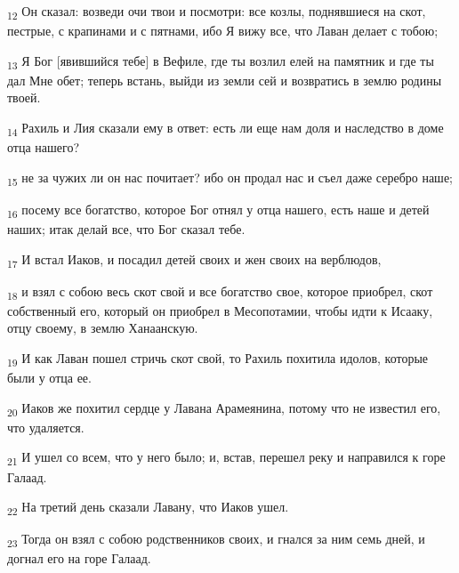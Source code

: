 \begin{tcolorbox}
\textsubscript{12} Он сказал: возведи очи твои и посмотри: все козлы, поднявшиеся на скот, пестрые, с крапинами и с пятнами, ибо Я вижу все, что Лаван делает с тобою;
\end{tcolorbox}
\begin{tcolorbox}
\textsubscript{13} Я Бог [явившийся тебе] в Вефиле, где ты возлил елей на памятник и где ты дал Мне обет; теперь встань, выйди из земли сей и возвратись в землю родины твоей.
\end{tcolorbox}
\begin{tcolorbox}
\textsubscript{14} Рахиль и Лия сказали ему в ответ: есть ли еще нам доля и наследство в доме отца нашего?
\end{tcolorbox}
\begin{tcolorbox}
\textsubscript{15} не за чужих ли он нас почитает? ибо он продал нас и съел даже серебро наше;
\end{tcolorbox}
\begin{tcolorbox}
\textsubscript{16} посему все богатство, которое Бог отнял у отца нашего, есть наше и детей наших; итак делай все, что Бог сказал тебе.
\end{tcolorbox}
\begin{tcolorbox}
\textsubscript{17} И встал Иаков, и посадил детей своих и жен своих на верблюдов,
\end{tcolorbox}
\begin{tcolorbox}
\textsubscript{18} и взял с собою весь скот свой и все богатство свое, которое приобрел, скот собственный его, который он приобрел в Месопотамии, чтобы идти к Исааку, отцу своему, в землю Ханаанскую.
\end{tcolorbox}
\begin{tcolorbox}
\textsubscript{19} И как Лаван пошел стричь скот свой, то Рахиль похитила идолов, которые были у отца ее.
\end{tcolorbox}
\begin{tcolorbox}
\textsubscript{20} Иаков же похитил сердце у Лавана Арамеянина, потому что не известил его, что удаляется.
\end{tcolorbox}
\begin{tcolorbox}
\textsubscript{21} И ушел со всем, что у него было; и, встав, перешел реку и направился к горе Галаад.
\end{tcolorbox}
\begin{tcolorbox}
\textsubscript{22} На третий день сказали Лавану, что Иаков ушел.
\end{tcolorbox}
\begin{tcolorbox}
\textsubscript{23} Тогда он взял с собою родственников своих, и гнался за ним семь дней, и догнал его на горе Галаад.
\end{tcolorbox}
